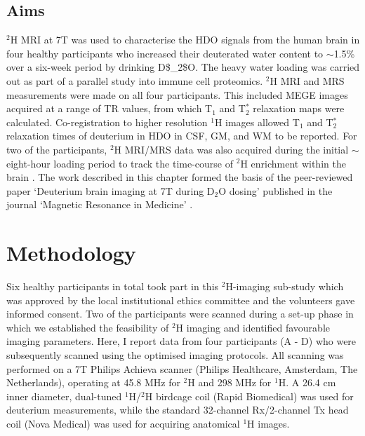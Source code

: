 \subsection{Aims}

$^2$H MRI at 7T was used to characterise the \ac{HDO} signals from the human brain in four healthy participants who increased their deuterated water content to $\sim$1.5\% over a six-week period by drinking \ac{D$_2$O}. The heavy water loading was carried out as part of a parallel study into immune cell proteomics. $^2$H MRI and MRS measurements were made on all four participants. This included \ac{MEGE} images acquired at a range of \ac{TR} values, from which T$_1$ and T$_2^*$ relaxation maps were calculated. Co-registration to higher resolution $^1$H images allowed T$_1$ and T$_2^*$ relaxation times of deuterium in \ac{HDO} in \ac{CSF}, \ac{GM}, and \ac{WM} to be reported. For two of the participants, $^2$H \ac{MRI}/\ac{MRS} data was also acquired during the initial $\sim$eight-hour loading period to track the time-course of $^2$H enrichment within the brain \cite{Cocking2023DeuteriumDosing}. The work described in this chapter formed the basis of the peer-reviewed paper `Deuterium brain imaging at 7T during D$_2$O dosing' published in the journal `Magnetic Resonance in Medicine' \cite{Cocking2023DeuteriumDosing}.


\section{Methodology}

Six healthy participants in total took part in this $^2$H-imaging sub-study which was approved by the local institutional ethics committee and the volunteers gave informed consent. Two of the participants were scanned during a set-up phase in which we established the feasibility of $^2$H imaging and identified favourable imaging parameters. Here, I report data from four participants (A - D) who were subsequently scanned using the optimised imaging protocols. All scanning was performed on a 7T Philips Achieva scanner (Philips Healthcare, Amsterdam, The Netherlands), operating at 45.8 MHz for $^2$H and 298 MHz for $^1$H. A 26.4 cm inner diameter, dual-tuned $^1$H/$^2$H birdcage coil (Rapid Biomedical) was used for deuterium measurements, while the standard 32-channel Rx/2-channel Tx head coil (Nova Medical) was used for acquiring anatomical $^1$H images.  

